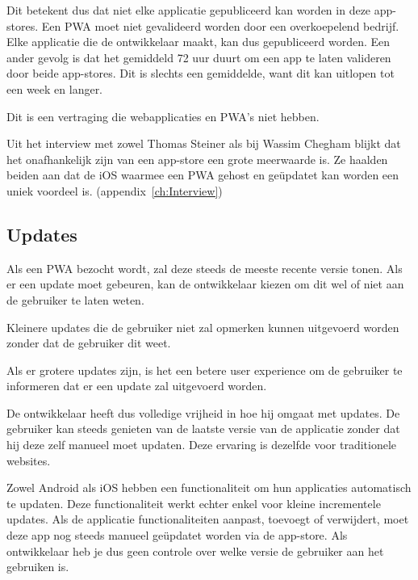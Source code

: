 	Dit betekent dus dat niet elke applicatie gepubliceerd kan worden in deze app-stores. Een PWA moet niet gevalideerd worden door een overkoepelend bedrijf. Elke applicatie die de ontwikkelaar maakt, kan dus gepubliceerd worden.
	Een ander gevolg is dat het gemiddeld 72 uur duurt om een app te laten valideren door beide app-stores. Dit is slechts een gemiddelde, want dit kan uitlopen tot een week en langer.
	\autocite{Siddiqui2019}
	
	Dit is een vertraging die webapplicaties en PWA's niet hebben.
	
	Uit het interview met zowel Thomas Steiner als bij Wassim Chegham blijkt dat het onafhankelijk zijn van een app-store een grote meerwaarde is. Ze haalden beiden aan dat de iOS waarmee een PWA gehost en geüpdatet kan worden een uniek voordeel is.
	(appendix~\ref{ch:Interview})
	
\subsection{Updates}

	Als een PWA bezocht wordt, zal deze steeds de meeste recente versie tonen. Als er een update moet gebeuren, kan de ontwikkelaar kiezen om dit wel of niet aan de gebruiker te laten weten. 	
	\autocite{Hume2018}
	
	Kleinere updates die de gebruiker niet zal opmerken kunnen uitgevoerd worden zonder dat de gebruiker dit weet.
	 \autocite{Sanderson2020}
	 
	Als er grotere updates zijn, is het een betere user experience om de gebruiker te informeren dat er een update zal uitgevoerd worden.
	\autocite{Wicki2017}
	 
	De ontwikkelaar heeft dus volledige vrijheid in hoe hij omgaat met updates. De gebruiker kan steeds genieten van de laatste versie van de applicatie zonder dat hij deze zelf manueel moet updaten. Deze ervaring is dezelfde voor traditionele websites.
	
	Zowel Android als iOS hebben een functionaliteit om hun applicaties automatisch te updaten. Deze functionaliteit werkt echter enkel voor kleine incrementele updates. Als de applicatie functionaliteiten aanpast, toevoegt of verwijdert, moet deze app nog steeds manueel geüpdatet worden via de app-store. Als ontwikkelaar heb je dus geen controle over welke versie de gebruiker aan het gebruiken is.
	\autocite{Apple2020d}
	\autocite{AndroidDevelopers2020}
		


